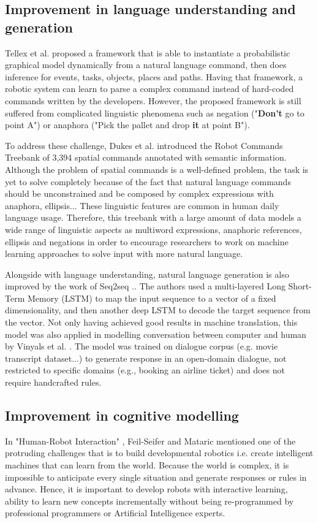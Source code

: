 \documentclass[10pt, a4paper]{article}
\begin{document}
\subsection{Improvement in language understanding and generation}
Tellex et al.\cite{tellex2011understanding} proposed a framework that is able to instantiate a probabilistic graphical model dynamically from a natural language command, then does inference for events, tasks, objects, places and paths. Having that framework, a robotic system can learn to parse a complex command instead of hard-coded commands written by the developers. However, the proposed framework is still suffered from complicated linguistic phenomena such as negation ("\textbf{Don't} go to point A") or anaphora ("Pick the pallet and drop \textbf{it} at point B"). 

To address these challenge, Dukes et al. \cite{dukes2014semeval} introduced the Robot Commands Treebank of 3,394 spatial commands annotated with semantic information. Although the problem of spatial commands is a well-defined problem, the task is yet to solve completely because of the fact that natural language commands should be unconstrained and be composed by complex expressions with anaphora, ellipsis... These linguistic features are common in human daily language usage. Therefore, this treebank with a large amount of data models a wide range of linguistic aspects as multiword expressions, anaphoric references, ellipsis and negations in order to encourage researchers to work on machine learning approaches to solve input with more natural language.

Alongside with language understanding, natural language generation is also improved by the work of Seq2seq .\cite{sutskever2014sequence}. The authors used a multi-layered Long Short-Term Memory (LSTM) to map the input sequence to a vector of a fixed dimensionality, and then another deep LSTM to decode the target sequence from the vector. Not only having achieved good results in machine translation, this model was also applied in modelling conversation between computer and human by Vinyals et al. \cite{vinyals2015neural}. The model was trained on dialogue corpus (e.g. movie transcript dataset...) to generate response in an open-domain dialogue, not restricted to specific domains (e.g., booking an airline ticket) and does not require handcrafted rules.

\subsection{Improvement in cognitive modelling}
In "Human-Robot Interaction" \cite{feil2009human}, Feil-Seifer and Mataric mentioned one of the protruding challenges that is to build developmental robotics i.e. create intelligent machines that can learn from the world. Because  the  world  is  complex, it is  impossible  to  anticipate  every  single situation and  generate responses or rules in advance. Hence, it is important to develop robots with interactive learning, ability to learn new concepts incrementally without being re-programmed by professional programmers or Artificial Intelligence experts.
\end{document}
